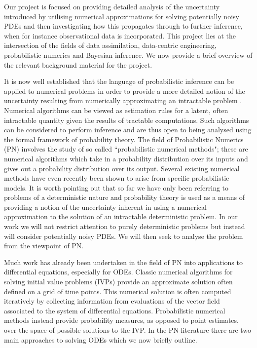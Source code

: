 Our project is focused on providing detailed analysis of the uncertainty introduced by utilising numerical approximations for solving potentially noisy PDEs and then investigating how this propagates through to further inference, when for instance observational data is incorporated. This project lies at the intersection of the fields of data assimilation, data-centric engineering, probabilistic numerics and Bayesian inference. We now provide a brief overview of the relevant background material for the project.

It is now well established that the language of probabilistic inference can be applied to numerical problems in order to provide a more detailed notion of the uncertainty resulting from numerically approximating an intractable problem \textcolor{blue}{\cite{diaconis1988bayesian,o1992bayesian,skilling1992bayesian,hennig2015probabilistic}}. Numerical algorithms can be viewed as estimation rules for a latent, often intractable quantity given the results of tractable computations. Such algorithms can be considered to perform inference and are thus open to being analysed using the formal framework of probability theory. The field of Probabilistic Numerics (PN) \textcolor{blue}{\cite{probNumericsSite}} involves the study of so called ``probabilistic numerical methods"; these are numerical algorithms which take in a probability distribution over its inputs and gives out a probability distribution over its output. Several existing numerical methods have even recently been shown to arise from specific probabilistic models. It is worth pointing out that so far we have only been referring to problems of a deterministic nature and probability theory is used as a means of providing a notion of the uncertainty inherent in using a numerical approximation to the solution of an intractable deterministic problem. In our work we will not restrict attention to purely deterministic problems but instead will consider potentially noisy PDEs. We will then seek to analyse the problem from the viewpoint of PN.

Much work has already been undertaken in the field of PN into applications to differential equations, especially for ODEs. Classic numerical algorithms for solving initial value problems (IVPs) provide an approximate solution often defined on a grid of time points. This numerical solution is often computed iteratively by collecting information from evaluations of the vector field associated to the system of differential equations. Probabilistic numerical methods instead provide probability measures, as opposed to point estimates, over the space of possible solutions to the IVP. In the PN literature there are two main approaches to solving ODEs which we now briefly outline.

